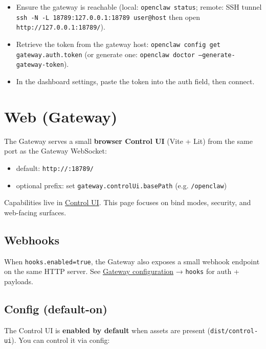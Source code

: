 \begin{itemize}
  \item Ensure the gateway is reachable (local: \texttt{openclaw status}; remote: SSH tunnel \texttt{ssh -N -L 18789:127.0.0.1:18789 user@host} then open \texttt{http://127.0.0.1:18789/}).
  \item Retrieve the token from the gateway host: \texttt{openclaw config get gateway.auth.token} (or generate one: \texttt{openclaw doctor --generate-gateway-token}).
  \item In the dashboard settings, paste the token into the auth field, then connect.
\end{itemize}



\clearpage

\section{Web (Gateway)}


The Gateway serves a small \textbf{browser Control UI} (Vite + Lit) from the same port as the Gateway WebSocket:

\begin{itemize}
  \item default: \texttt{http://:18789/}
  \item optional prefix: set \texttt{gateway.controlUi.basePath} (e.g. \texttt{/openclaw})
\end{itemize}


Capabilities live in \href{/web/control-ui}{Control UI}.
This page focuses on bind modes, security, and web-facing surfaces.

\subsection{Webhooks}


When \texttt{hooks.enabled=true}, the Gateway also exposes a small webhook endpoint on the same HTTP server.
See \href{/gateway/configuration}{Gateway configuration} → \texttt{hooks} for auth + payloads.

\subsection{Config (default-on)}


The Control UI is \textbf{enabled by default} when assets are present (\texttt{dist/control-ui}).
You can control it via config:


